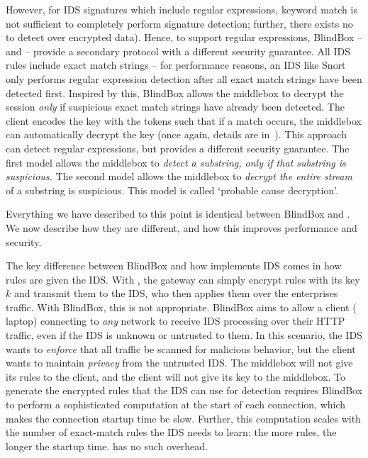   However, for IDS signatures which include regular expressions, keyword match is not sufficient to completely perform signature detection; further, there exists no  to detect over encrypted data).
  Hence, to support regular expressions, BlindBox -- and \sys -- provide a secondary protocol with a different security guarantee. 
  All IDS rules include exact match strings -- for performance reasons, an IDS like Snort~\cite{Snort} only performs regular expression detection after all exact match strings have been detected first.
  Inspired by this, BlindBox allows the middlebox to decrypt the session {\it only} if suspicious exact match strings have already been detected.
  The client encodes the key with the tokens such that if a match occurs, the middlebox can automatically decrypt the key (once again, details are in~\cite{blindbox}).
  This approach can detect regular expressions, but provides a different security guarantee. 
  The first model allows the middlebox to {\it detect a substring, only if that substring is suspicious.} 
  The second model allows the middlebox to {\it decrypt the entire stream} of a substring is suspicious.
  This model is called `probable cause decryption'.

  Everything we have described to this point is identical between BlindBox and \sys. We now describe how they are different, and how this improves performance and security.

The key difference between BlindBox and how \sys implements IDS comes in how rules are given the IDS.
With \sys, the gateway can simply encrypt rules with its key $k$ and transmit them to the IDS, who then applies them over the enterprises traffic.
With BlindBox, this is not appropriate.
BlindBox aims to allow a client (\eg{} laptop) connecting to {\em any} network to receive IDS processing over their HTTP traffic, even if the IDS is unknown or untrusted to them.
In this scenario, the IDS wants to {\it enforce} that all traffic be scanned for malicious behavior, but the client wants to maintain {\it privacy} from the untrusted IDS.
The middlebox will not give its rules to the client, and the client will not give its key to the middlebox.
 To generate the encrypted rules that the IDS can use for detection requires BlindBox to perform
a sophisticated computation at the start of each connection, which makes the connection
startup time be slow. 
Further, this computation scales with the number of exact-match rules the IDS needs to learn: the more rules, the longer the startup time.
\sys has no such overhead.

